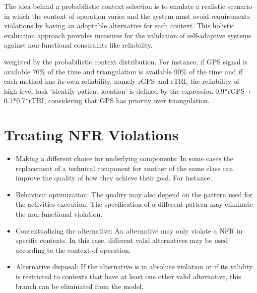 
The idea behind a probabilistic context selection is to emulate a realistic scenario in which the context of operation varies and the system must avoid requirements violations by  having an adoptable alternative for each context. This holistic evaluation approach provides measures for the validation of self-adaptive systems against non-functional constraints like reliability.

weighted by the probabilistic context distribution. For instance, if GPS signal is available 70\% of the time and triangulation is available 90\% of the time and if each method has its own reliability, namely rGPS and rTRI, the reliability of high-level task `identify patient location' is defined by the expression 0.9*rGPS + 0.1*0.7*rTRI, considering that GPS has priority over triangulation. 

\section{Treating NFR Violations}

\begin{itemize}

\item Making a different choice for underlying components: In some cases the replacement of a technical component for another of the same class can improve the quality of how they achieve their goal. For instance,
\medskip

\item Behaviour optimization: The quality may also depend on the pattern used for the activities execution. The specification of a different pattern may eliminate the non-functional violation. 
\medskip

\item Contextualizing the alternative: An alternative may only violate a NFR in specific contexts. In this case, different valid alternatives may be used according to the context of operation.
\medskip

\item Alternative disposal: If the alternative is in absolute violation or if its validity is restricted to contexts that have at least one other valid alternative, this branch can be eliminated from the model.

\end{itemize}

